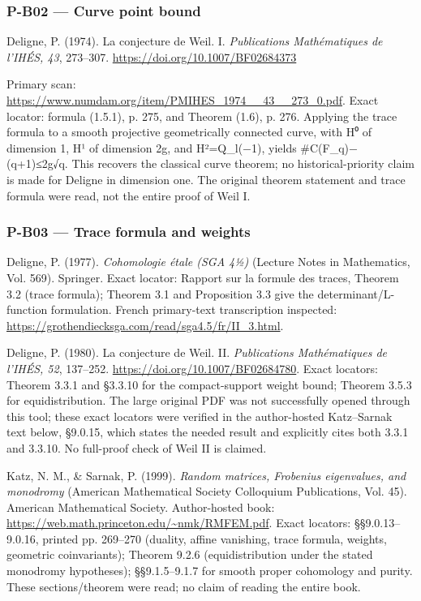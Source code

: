 \documentclass[11pt,a4paper]{article}
\theoremstyle{definition}\newtheorem{definition}{Definition}
\begin{document}
\subsubsection{P-B02 --- Curve point
bound}\label{p-b02--curve-point-bound}

Deligne, P. (1974). La conjecture de Weil. I. \emph{Publications
Mathématiques de l'IHÉS, 43}, 273--307.
\url{https://doi.org/10.1007/BF02684373}

Primary scan:
\url{https://www.numdam.org/item/PMIHES_1974__43__273_0.pdf}. Exact
locator: formula (1.5.1), p. 275, and Theorem (1.6), p. 276. Applying
the trace formula to a smooth projective geometrically connected curve,
with H⁰ of dimension 1, H¹ of dimension 2g, and H²=Q\_l(−1), yields
\textbar\#C(F\_q)−(q+1)\textbar≤2g√q. This recovers the classical curve
theorem; no historical-priority claim is made for Deligne in dimension
one. The original theorem statement and trace formula were read, not the
entire proof of Weil I.

\subsubsection{P-B03 --- Trace formula and
weights}\label{p-b03--trace-formula-and-weights}

Deligne, P. (1977). \emph{Cohomologie étale (SGA 4½)} (Lecture Notes in
Mathematics, Vol. 569). Springer. Exact locator: Rapport sur la formule
des traces, Theorem 3.2 (trace formula); Theorem 3.1 and Proposition 3.3
give the determinant/L-function formulation. French primary-text
transcription inspected:
\url{https://grothendiecksga.com/read/sga4.5/fr/II_3.html}.

Deligne, P. (1980). La conjecture de Weil. II. \emph{Publications
Mathématiques de l'IHÉS, 52}, 137--252.
\url{https://doi.org/10.1007/BF02684780}. Exact locators: Theorem 3.3.1
and §3.3.10 for the compact-support weight bound; Theorem 3.5.3 for
equidistribution. The large original PDF was not successfully opened
through this tool; these exact locators were verified in the
author-hosted Katz--Sarnak text below, §9.0.15, which states the needed
result and explicitly cites both 3.3.1 and 3.3.10. No full-proof check
of Weil II is claimed.

Katz, N. M., \& Sarnak, P. (1999). \emph{Random matrices, Frobenius
eigenvalues, and monodromy} (American Mathematical Society Colloquium
Publications, Vol. 45). American Mathematical Society. Author-hosted
book: \url{https://web.math.princeton.edu/~nmk/RMFEM.pdf}. Exact
locators: §§9.0.13--9.0.16, printed pp. 269--270 (duality, affine
vanishing, trace formula, weights, geometric coinvariants); Theorem
9.2.6 (equidistribution under the stated monodromy hypotheses);
§§9.1.5--9.1.7 for smooth proper cohomology and purity. These
sections/theorem were read; no claim of reading the entire book.
\end{document}
